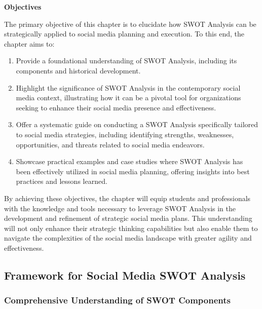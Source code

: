 \documentclass[
]{book}
\providecommand{\tightlist}{%
  \setlength{\itemsep}{0pt}\setlength{\parskip}{0pt}}
\begin{document}
\textbf{Objectives}

The primary objective of this chapter is to elucidate how SWOT Analysis can be strategically applied to social media planning and execution. To this end, the chapter aims to:

\begin{enumerate}
\def\labelenumi{\arabic{enumi}.}
\tightlist
\item
  Provide a foundational understanding of SWOT Analysis, including its components and historical development.
\item
  Highlight the significance of SWOT Analysis in the contemporary social media context, illustrating how it can be a pivotal tool for organizations seeking to enhance their social media presence and effectiveness.
\item
  Offer a systematic guide on conducting a SWOT Analysis specifically tailored to social media strategies, including identifying strengths, weaknesses, opportunities, and threats related to social media endeavors.
\item
  Showcase practical examples and case studies where SWOT Analysis has been effectively utilized in social media planning, offering insights into best practices and lessons learned.
\end{enumerate}

By achieving these objectives, the chapter will equip students and professionals with the knowledge and tools necessary to leverage SWOT Analysis in the development and refinement of strategic social media plans. This understanding will not only enhance their strategic thinking capabilities but also enable them to navigate the complexities of the social media landscape with greater agility and effectiveness.

\hypertarget{framework-for-social-media-swot-analysis}{%
\subsection*{Framework for Social Media SWOT Analysis}\label{framework-for-social-media-swot-analysis}}

\hypertarget{comprehensive-understanding-of-swot-components}{%
\subsubsection*{Comprehensive Understanding of SWOT Components}\label{comprehensive-understanding-of-swot-components}}
\end{document}
